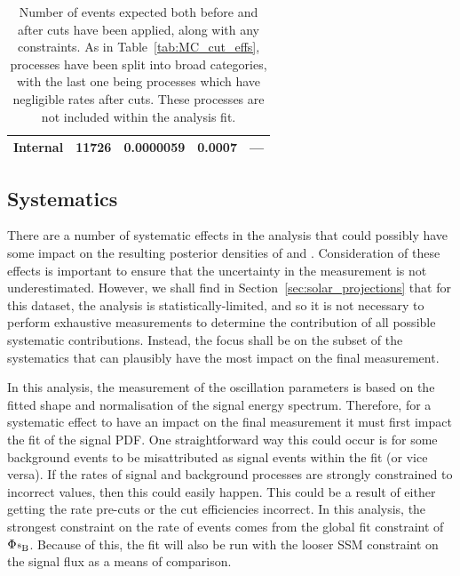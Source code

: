 \begin{table}
\begin{center}
\begin{tabulary}{\textwidth}{c R R R R}
            Internal       & \num{11726}&0.0000059& 0.0007& --- \\
            \hline
        \end{tabulary}
    \end{center}
    \caption[Number of events expected both before and after cuts have been applied, along with any constraints.]
    {Number of events expected both before and after cuts have been applied, along with any constraints. As in Table~\ref{tab:MC_cut_effs}, processes have been split into broad categories, with the last one being processes which have negligible rates after cuts. These processes are not included within the analysis fit.}
    \label{tab:MC_expected_rates_constraints}
\end{table}

\subsection{Systematics}
There are a number of systematic effects in the analysis that could possibly have some impact on the resulting posterior densities of \tonetwo{} and \dmsq{}. Consideration of these effects is important to ensure that the uncertainty in the measurement is not underestimated. However, we shall find in Section~\ref{sec:solar_projections} that for this dataset, the analysis is statistically-limited, and so it is not necessary to perform exhaustive measurements to determine the contribution of all possible systematic contributions. Instead, the focus shall be on the subset of the systematics that can plausibly have the most impact on the final measurement.

In this analysis, the measurement of the oscillation parameters is based on the fitted shape and normalisation of the \beight{} signal energy spectrum. Therefore, for a systematic effect to have an impact on the final measurement it must first impact the fit of the signal PDF. One straightforward way this could occur is for some background events to be misattributed as signal events within the fit (or vice versa). If the rates of signal and background processes are strongly constrained to incorrect values, then this could easily happen. This could be a result of either getting the rate pre-cuts or the cut efficiencies incorrect. In this analysis, the strongest constraint on the rate of events comes from the global fit constraint of $\Phi_{\beight{}}$. Because of this, the fit will also be run with the looser SSM constraint on the signal flux as a means of comparison.

